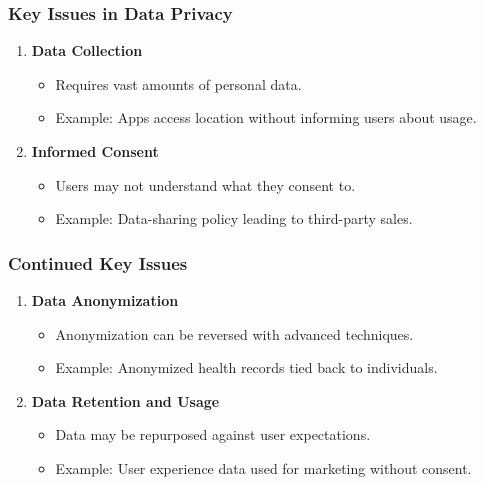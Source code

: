 \documentclass[aspectratio=169]{beamer}
\begin{document}
\begin{frame}[fragile]
    \frametitle{Key Issues in Data Privacy}
    \begin{enumerate}
        \item \textbf{Data Collection}
            \begin{itemize}
                \item Requires vast amounts of personal data.
                \item Example: Apps access location without informing users about usage.
            \end{itemize}
        \item \textbf{Informed Consent}
            \begin{itemize}
                \item Users may not understand what they consent to.
                \item Example: Data-sharing policy leading to third-party sales.
            \end{itemize}
    \end{enumerate}
\end{frame}

\begin{frame}[fragile]
    \frametitle{Continued Key Issues}
    \begin{enumerate}[resume]
        \item \textbf{Data Anonymization}
            \begin{itemize}
                \item Anonymization can be reversed with advanced techniques.
                \item Example: Anonymized health records tied back to individuals.
            \end{itemize}
        \item \textbf{Data Retention and Usage}
            \begin{itemize}
                \item Data may be repurposed against user expectations.
                \item Example: User experience data used for marketing without consent.
            \end{itemize}
    \end{enumerate}
\end{frame}
\end{document}
